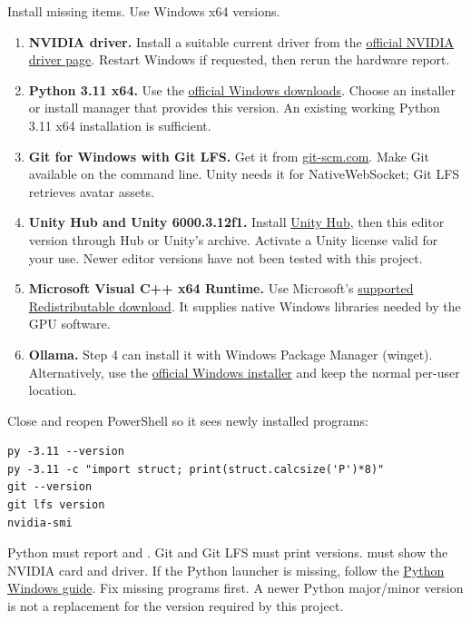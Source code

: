 \clearpage
{}
Install missing items. Use Windows x64 versions.
\begin{enumerate}
\item \textbf{NVIDIA driver.} Install a suitable current driver from the
\href{https://www.nvidia.com/en-us/drivers/}{official NVIDIA driver page}.
Restart Windows if requested, then rerun the hardware report.
\item \textbf{Python 3.11 x64.} Use the
\href{https://www.python.org/downloads/windows/}{official Windows downloads}.
Choose an installer or install manager that provides this version.
An existing working Python 3.11 x64 installation is sufficient.
\item \textbf{Git for Windows with Git LFS.} Get it from
\href{https://git-scm.com/downloads/win}{git-scm.com}. Make Git available on the
command line. Unity needs it for NativeWebSocket; Git LFS retrieves avatar assets.
\item \textbf{Unity Hub and Unity 6000.3.12f1.} Install
\href{https://unity.com/download}{Unity Hub}, then this editor version through
Hub or Unity's archive. Activate a Unity license valid for your use.
Newer editor versions have not been tested with this project.
\item \textbf{Microsoft Visual C++ x64 Runtime.} Use Microsoft's
\href{https://learn.microsoft.com/en-us/cpp/windows/latest-supported-vc-redist}{supported Redistributable download}.
It supplies native Windows libraries needed by the GPU software.
\item \textbf{Ollama.} Step 4 can install it with Windows Package Manager
(winget). Alternatively, use the
\href{https://ollama.com/download/windows}{official Windows installer} and keep
the normal per-user location.
\end{enumerate}

Close and reopen PowerShell so it sees newly installed programs:
\begin{lstlisting}
py -3.11 --version
py -3.11 -c "import struct; print(struct.calcsize('P')*8)"
git --version
git lfs version
nvidia-smi
\end{lstlisting}
Python must report  and . Git and Git LFS must print versions.
 must show the NVIDIA card and driver. If the Python launcher
is missing, follow the \href{https://docs.python.org/3/using/windows.html}{Python Windows guide}.
Fix missing programs first. A newer Python major/minor version is not a
replacement for the version required by this project.


